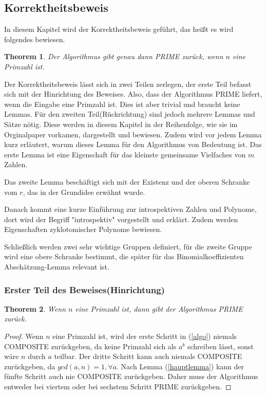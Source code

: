 \documentclass[12pt,oneside]{article}
\newtheorem{theorem}{Theorem}[section]
\theoremstyle{remark}
\theoremstyle{definition}
\begin{document}
\subsection{Korrektheitsbeweis}
In diesem Kapitel wird der Korrektheitsbeweis geführt, das heißt es wird folgendes bewiesen.
\begin{theorem}
Der Algorithmus gibt genau dann PRIME zurück, wenn $n$ eine Primzahl ist.
\end{theorem}
Der Korrektheitsbeweis lässt sich in zwei Teilen zerlegen, der erste Teil befasst sich mit der Hinrichtung des Beweises. Also, dass der Algorithmus PRIME liefert, wenn die Eingabe eine Primzahl ist. Dies ist aber trivial und braucht keine Lemmas. Für den zweiten Teil(Rückrichtung) sind jedoch mehrere Lemmas und Sätze nötig. Diese werden in diesem Kapitel in der Reihenfolge, wie sie im Orginalpaper vorkamen, dargestellt und bewiesen. Zudem wird vor jedem Lemma kurz erläutert, warum dieses Lemma für den Algorithmus von Bedeutung ist. Das erste Lemma ist eine Eigenschaft für das kleinste gemeinsame Vielfaches von $m$ Zahlen.

Das zweite Lemma beschäftigt sich mit der Existenz und der oberen Schranke vom $r$, das in der Grundidee erwähnt wurde.

Danach kommt eine kurze Einführung zur introspektiven Zahlen und Polynome, dort wird der Begriff "introspektiv" vorgestellt und erklärt. Zudem werden Eigenschaften zyklotomischer Polynome bewiesen.

Schließlich werden zwei sehr wichtige Gruppen definiert, für die zweite Gruppe wird eine obere Schranke bestimmt, die später für das Binomialkoeffizienten Abschätzung-Lemma relevant ist.

\subsubsection{Erster Teil des Beweises(Hinrichtung)}
\begin{theorem}
Wenn $n$ eine Primzahl ist, dann gibt der Algorithmus PRIME zurück.
\end{theorem}

\begin{proof}
Wenn $n$ eine Primzahl ist, wird der erste Schritt in (\ref{algo}) niemals COMPOSITE zurückgeben, da keine Primzahl sich als $a^b$ schreiben lässt, sonst wäre $n$ durch $a$ teilbar. Der dritte Schritt kann auch niemals COMPOSITE zurückgeben, da $gcd(a,n) = 1, \forall a$. Nach Lemma (\ref{hauptlemma}) kann der fünfte Schritt auch nie COMPOSITE zurückgeben. Daher muss der Algorithmus entweder bei viertem oder bei sechstem Schritt PRIME zurückgeben.  
\end{proof}
\end{document}

